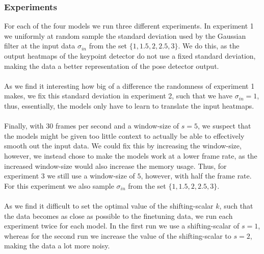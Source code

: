 \documentclass[./main.tex]{subfiles}
\begin{document}
\subsubsection{Experiments} For each of the four models we run three different experiments. In experiment 1 we uniformly at random sample the standard deviation used by the Gaussian filter at the input data $\sigma_{in}$ from the set $\{1, 1.5, 2, 2.5, 3\}$. We do this, as the output heatmaps of the keypoint detector do not use a fixed standard deviation, making the data a better representation of the pose detector output. 
\\
\\
As we find it interesting how big of a difference the randomness of experiment 1 makes, we fix this standard deviation in experiment 2, such that we have $\sigma_{in} = 1$, thus, essentially, the models only have to learn to translate the input heatmaps.
\\
\\
Finally, with $30$ frames per second and a window-size of $s = 5$, we suspect that the models might be given too little context to actually be able to effectively smooth out the input data. We could fix this by increasing the window-size, however, we instead chose to make the models work at a lower frame rate, as the increased window-size would also increase the memory usage. Thus, for experiment 3 we still use a window-size of $5$, however, with half the frame rate. For this experiment we also sample $\sigma_{in}$ from the set $\{1, 1.5, 2, 2.5, 3\}$.
\\
\\
As we find it difficult to set the optimal value of the shifting-scalar $k$, such that the data becomes as close as possible to the finetuning data, we run each experiment twice for each model. In the first run we use a shifting-scalar of $s = 1$, whereas for the second run we increase the value of the shifting-scalar to $s = 2$, making the data a lot more noisy.
\end{document}
